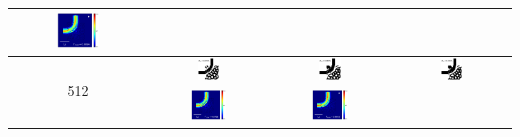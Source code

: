 \begin{table}[H]
\begin{tabular}{|c|c|c|c|}
      \includegraphics[width=0.33\textwidth]{image/results/bend/L-BFGS-B/visualize_field_fab_256.png} \\
    \hline
      \multirow{2}{*}{512} &
      \includegraphics[width=0.20\textwidth]{image/results/bend/L-BFGS-B/visualize_eps_cont_512.png} &
      \includegraphics[width=0.20\textwidth]{image/results/bend/L-BFGS-B/visualize_eps_disc_512.png} &
      \includegraphics[width=0.20\textwidth]{image/results/bend/L-BFGS-B/visualize_eps_fab_512.png} \\
      \cline{2-4}
      &
      \includegraphics[width=0.33\textwidth]{image/results/bend/L-BFGS-B/visualize_field_cont_512.png} &
      \includegraphics[width=0.33\textwidth]{image/results/bend/L-BFGS-B/visualize_field_disc_512.png} &

\end{tabular}
\end{table}
